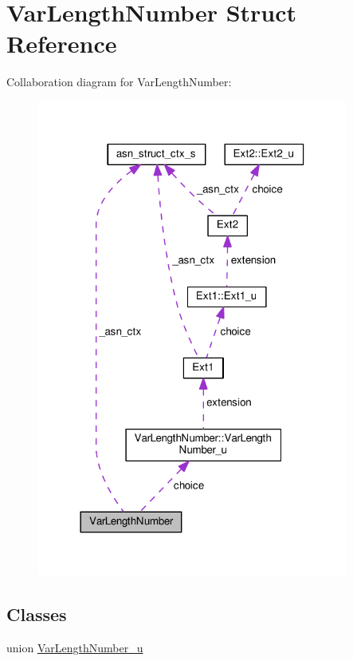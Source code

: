\hypertarget{structVarLengthNumber}{}\section{Var\+Length\+Number Struct Reference}
\label{structVarLengthNumber}


Collaboration diagram for Var\+Length\+Number\+:\nopagebreak
\begin{figure}[H]
\begin{center}
\leavevmode
\includegraphics[width=290pt]{structVarLengthNumber__coll__graph}
\end{center}
\end{figure}
\subsection*{Classes}
\begin{DoxyCompactItemize}
\item 
union \hyperlink{unionVarLengthNumber_1_1VarLengthNumber__u}{Var\+Length\+Number\+\_\+u}
\end{DoxyCompactItemize}
